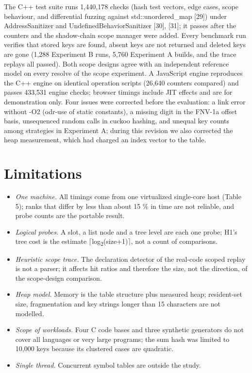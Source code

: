 \documentclass{ieeeaccess}
\begin{document}
The C++ test suite runs 1,440,178 checks (hash test vectors, edge cases, scope behaviour, and differential fuzzing against std::unordered\_map [29]) under AddressSanitizer and UndefinedBehaviorSanitizer [30], [31]; it passes after the counters and the shadow-chain scope manager were added. Every benchmark run verifies that stored keys are found, absent keys are not returned and deleted keys are gone (1,288 Experiment B runs, 5,760 Experiment A builds, and the trace replays all passed). Both scope designs agree with an independent reference model on every resolve of the scope experiment. A JavaScript engine reproduces the C++ engine on identical operation scripts (26,640 counters compared) and passes 433,531 engine checks; browser timings include JIT effects and are for demonstration only. Four issues were corrected before the evaluation: a link error without -O2 (odr-use of static constants), a missing digit in the FNV-1a offset basis, unsequenced random calls in cuckoo hashing, and unequal key counts among strategies in Experiment A; during this revision we also corrected the heap measurement, which had charged an index vector to the table.

\section{Limitations}

\begin{itemize}
\item \emph{One machine.} All timings come from one virtualized single-core host (Table 5); ranks that differ by less than about 15 \% in time are not reliable, and probe counts are the portable result.
\item \emph{Logical probes.} A slot, a list node and a tree level are each one probe; H1's tree cost is the estimate $\lceil$log\textsubscript{2}(size+1)$\rceil$, not a count of comparisons.
\item \emph{Heuristic scope trace.} The declaration detector of the real-code scoped replay is not a parser; it affects hit ratios and therefore the size, not the direction, of the scope-design comparison.
\item \emph{Heap model.} Memory is the table structure plus measured heap; resident-set size, fragmentation and key strings longer than 15 characters are not modelled.
\item \emph{Scope of workloads.} Four C code bases and three synthetic generators do not cover all languages or very large programs; the sum hash was limited to 10,000 keys because its clustered cases are quadratic.
\item \emph{Single thread.} Concurrent symbol tables are outside the study.
\end{itemize}
\end{document}
